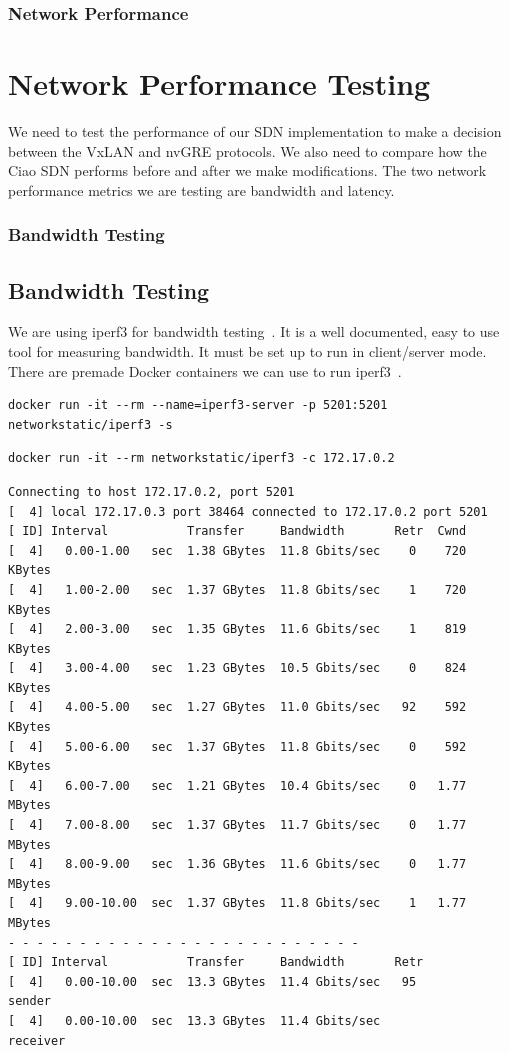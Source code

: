 \documentclass[pdf]{beamer}
\begin{document}
\begin{frame}[allowframebreaks]
	\frametitle{Network Performance}
	\section{Network Performance Testing}
	We need to test the performance of our SDN implementation to make 
	a decision between the VxLAN and nvGRE protocols.
	We also need to compare how the Ciao SDN performs before and after we make 
	modifications.
	The two network performance metrics we are testing are bandwidth and 
	latency.
\end{frame}

\begin{frame}
	\frametitle{Bandwidth Testing}
	\subsection{Bandwidth Testing}
	We are using iperf3 for bandwidth testing~\cite{iperf}.
	It is a well documented, easy to use tool for measuring bandwidth.
	It must be set up to run in client/server mode.
	There are premade Docker containers we can use to run 
	iperf3~\cite{iperfdocker}.

	\begin{lstlisting}[caption = Running an iperf3 Docker container in server mode]
docker run -it --rm --name=iperf3-server -p 5201:5201 networkstatic/iperf3 -s
	\end{lstlisting}

	\begin{lstlisting}[caption = Running an iperf3 Docker container in client mode]
docker run -it --rm networkstatic/iperf3 -c 172.17.0.2
	\end{lstlisting}

	\begin{lstlisting}[caption = iperf3 output, basicstyle=\small]
Connecting to host 172.17.0.2, port 5201
[  4] local 172.17.0.3 port 38464 connected to 172.17.0.2 port 5201
[ ID] Interval           Transfer     Bandwidth       Retr  Cwnd
[  4]   0.00-1.00   sec  1.38 GBytes  11.8 Gbits/sec    0    720 KBytes       
[  4]   1.00-2.00   sec  1.37 GBytes  11.8 Gbits/sec    1    720 KBytes       
[  4]   2.00-3.00   sec  1.35 GBytes  11.6 Gbits/sec    1    819 KBytes       
[  4]   3.00-4.00   sec  1.23 GBytes  10.5 Gbits/sec    0    824 KBytes       
[  4]   4.00-5.00   sec  1.27 GBytes  11.0 Gbits/sec   92    592 KBytes       
[  4]   5.00-6.00   sec  1.37 GBytes  11.8 Gbits/sec    0    592 KBytes       
[  4]   6.00-7.00   sec  1.21 GBytes  10.4 Gbits/sec    0   1.77 MBytes       
[  4]   7.00-8.00   sec  1.37 GBytes  11.7 Gbits/sec    0   1.77 MBytes       
[  4]   8.00-9.00   sec  1.36 GBytes  11.6 Gbits/sec    0   1.77 MBytes       
[  4]   9.00-10.00  sec  1.37 GBytes  11.8 Gbits/sec    1   1.77 MBytes       
- - - - - - - - - - - - - - - - - - - - - - - - -
[ ID] Interval           Transfer     Bandwidth       Retr
[  4]   0.00-10.00  sec  13.3 GBytes  11.4 Gbits/sec   95             sender
[  4]   0.00-10.00  sec  13.3 GBytes  11.4 Gbits/sec                  receiver


\end{lstlisting}
\end{frame}
\end{document}
